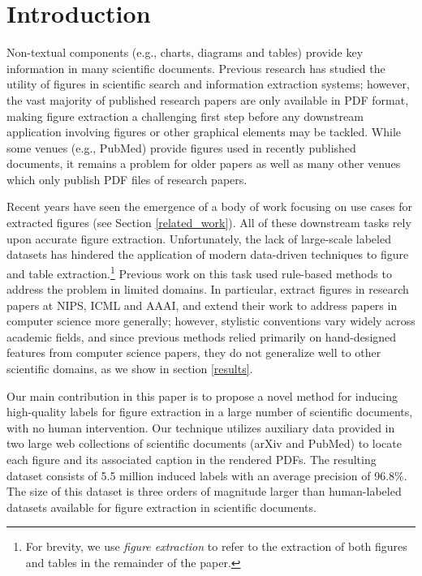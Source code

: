 \documentclass[sigconf]{acmart}
\begin{document}


\maketitle

\section{Introduction}%
Non-textual components (e.g., charts, diagrams and tables) provide key information in many scientific documents.
Previous research has studied the utility of figures in scientific search and information extraction systems; however, the vast majority of published research papers are only available in PDF format, making figure extraction a challenging first step before any downstream application involving figures or other graphical elements may be tackled.
While some venues (e.g., PubMed) provide figures used in recently published documents, it remains a problem for older papers as well as many other venues which only publish PDF files of research papers.

Recent years have seen the emergence of a body of work focusing on use cases for extracted figures (see Section \ref{related_work}). All of these downstream tasks rely upon accurate figure extraction. Unfortunately, the lack of large-scale labeled datasets has hindered the application of modern data-driven techniques to figure and table extraction.\footnote{For brevity, we use \emph{figure extraction} to refer to the extraction of both figures and tables in the remainder of the paper.}
Previous work on this task used rule-based methods to address the problem in limited domains.
In particular, \cite{pdffigures} extract figures in research papers at NIPS, ICML and AAAI, and \cite{pdffigures2} extend their work to address papers in computer science more generally; however, stylistic conventions vary widely across academic fields, and since previous methods relied primarily on hand-designed features from computer science papers, they do not generalize well to other scientific domains, as we show in section \ref{results}.

Our main contribution in this paper is to propose a novel method for inducing high-quality labels for figure extraction in a large number of scientific documents, with no human intervention.
Our technique utilizes auxiliary data provided in two large web collections of scientific documents (arXiv and PubMed) to locate each figure and its associated caption in the rendered PDFs.
The resulting dataset consists of 5.5 million induced labels with an average precision of 96.8\%.
The size of this dataset is three orders of magnitude larger than human-labeled datasets available for figure extraction in scientific documents.
\end{document}
